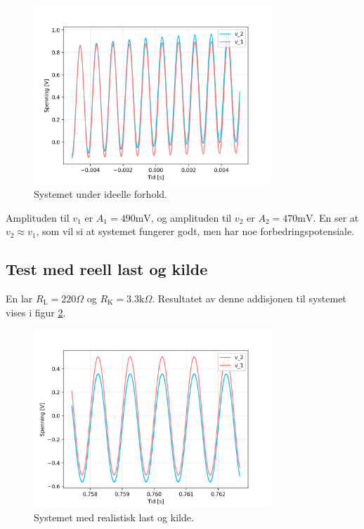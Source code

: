 \vspace{1cm}
\begin{figure}[!h]
    \centering
    \includegraphics[width=0.8\textwidth]{img/esda2-d5-ideelle-plot.png}
    \caption{Systemet under ideelle forhold.}
    \label{fig:ideal}
\end{figure}
\vspace{1cm}

Amplituden til $v_1$ er $A_1=490\text{mV}$, og amplituden til $v_2$ er $A_2=470\text{mV}$. En ser at $v_2\approx v_1$, som vil si at systemet fungerer godt, men har noe forbedringspotensiale. 

\clearpage

\subsection{Test med reell last og kilde}
En lar $R_\text{L}=220\Omega$ og $R_\text{K}=3.3\text{k}\Omega$. Resultatet av denne addisjonen til systemet vises i figur \ref{fig:real}.

\vspace{1cm}
\begin{figure}[!h]
    \centering
    \includegraphics[width=0.8\textwidth]{img/reell-last-kilde.png}
    \caption{Systemet med realistisk last og kilde.}
    \label{fig:real}
\end{figure}
\vspace{1cm}


